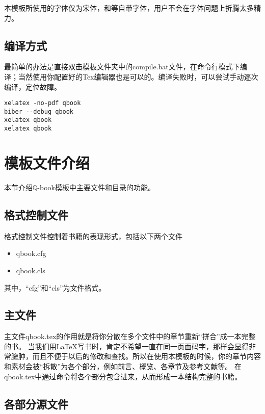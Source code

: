 本模板所使用的字体仅为宋体，{}和{}等自带字体，用户不会在字体问题上折腾太多精力。

\subsection{编译方式}

最简单的办法是直接双击模板文件夹中的compile.bat文件，在命令行模式下编译；当然使用你配置好的Tex编辑器也是可以的。编译失败时，可以尝试手动逐次编译，定位故障。
\begin{lstlisting}[basicstyle=\small\ttfamily, caption={手动逐次编译}, numbers=none]
xelatex -no-pdf qbook
biber --debug qbook
xelatex qbook
xelatex qbook
\end{lstlisting}

\section{模板文件介绍}

本节介绍$\mathbb{ Q }$-book模板中主要文件和目录的功能。

\subsection{格式控制文件}

格式控制文件控制着书籍的表现形式，包括以下两个文件
\begin{itemize}[noitemsep,topsep=0pt,parsep=0pt,partopsep=0pt]
	\item qbook.cfg
	\item qbook.cls
\end{itemize}
其中，“cfg”和“cls”为文件格式。

\subsection{主文件}

主文件qbook.tex的作用就是将你分散在多个文件中的章节重新“拼合”成一本完整的书。
当我们用\LaTeX 写书时，肯定不希望一直在同一页面码字，那样会显得非常臃肿，而且不便于以后的修改和查找。所以在使用本模板的时候，你的章节内容和素材会被“拆散”为各个部分，例如前言、概览、各章节及参考文献等。
在qbook.tex中通过\verb||命令将各个部分包含进来，从而形成一本结构完整的书籍。

\subsection{各部分源文件}

